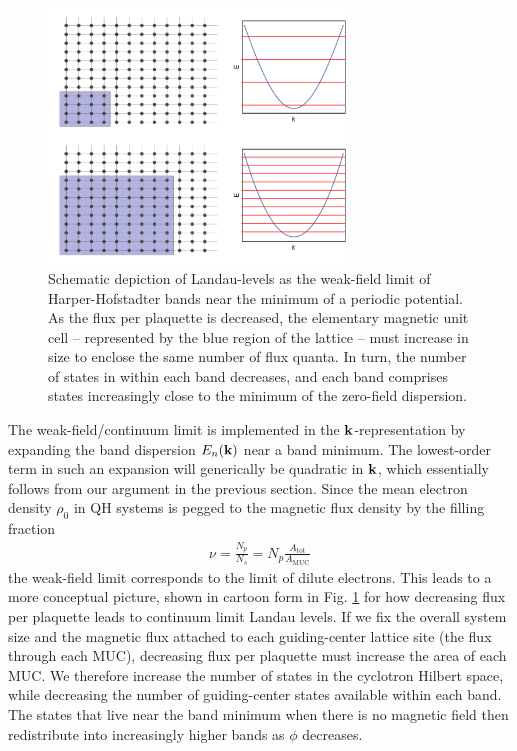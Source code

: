 \documentclass[aps,prb,twocolumn,letterpaper,twoside,nobalancelastpage,groupedaddress,amsmath,amssymb,floatfix,citeautoscript]{revtex4-1}
\begin{document}
\begin{figure}[thb]
\centering
\includegraphics[width=3.1in]{unit-cell-dispersion-grid.pdf}
\caption{\label{bands-schematic}Schematic depiction of Landau-levels as the weak-field limit of Harper-Hofstadter bands near the minimum of a periodic potential. As the flux per plaquette is decreased, the elementary magnetic unit cell -- represented by the blue region of the lattice -- must increase in size to enclose the same number of flux quanta. In turn, the number of states in within each band decreases, and each band comprises states increasingly close to the minimum of the zero-field dispersion.}
\end{figure}

The weak-field/continuum limit is implemented in the ${\bf k}$-representation by expanding the band dispersion $E_{n}({\bf k})$ near a band minimum. The lowest-order term in such an expansion will generically be quadratic in ${\bf k}$, which essentially follows from our argument in the previous section. Since the mean electron density $\rho_0$ in QH systems is pegged to the magnetic flux density by the filling fraction
\begin{align*}
\nu = \frac{N_p}{N_s} = N_p\frac{A_{\text{tot}}}{A_{\text{MUC}}}
\end{align*}
the weak-field limit corresponds to the limit of dilute electrons. This leads to a more conceptual picture, shown in cartoon form in Fig. \ref{bands-schematic} for how decreasing flux per plaquette leads to continuum limit Landau levels. If we fix the overall system size and the magnetic flux attached to each guiding-center lattice site (the flux through each MUC), decreasing flux per plaquette must increase the area of each MUC. We therefore increase the number of states in the cyclotron Hilbert space, while decreasing the number of guiding-center states available within each band. The states that live near the band minimum when there is no magnetic field then redistribute into increasingly higher bands as $\phi$ decreases.
\end{document}
